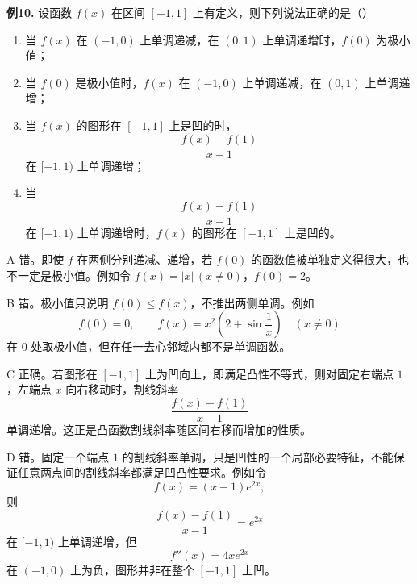 \begin{problemblock}
\textbf{例10.} 设函数 \(f(x)\) 在区间 \([-1,1]\) 上有定义，则下列说法正确的是（\quad）
\begin{enumerate}[label=\Alph*., leftmargin=2.2em]
\item 当 \(f(x)\) 在 \((-1,0)\) 上单调递减，在 \((0,1)\) 上单调递增时，\(f(0)\) 为极小值；
\item 当 \(f(0)\) 是极小值时，\(f(x)\) 在 \((-1,0)\) 上单调递减，在 \((0,1)\) 上单调递增；
\item 当 \(f(x)\) 的图形在 \([-1,1]\) 上是凹的时，
\[
\frac{f(x)-f(1)}{x-1}
\]
在 \([-1,1)\) 上单调递增；
\item 当
\[
\frac{f(x)-f(1)}{x-1}
\]
在 \([-1,1)\) 上单调递增时，\(f(x)\) 的图形在 \([-1,1]\) 上是凹的。
\end{enumerate}
\end{problemblock}
\begin{solutionblock}
A 错。即使 \(f\) 在两侧分别递减、递增，若 \(f(0)\) 的函数值被单独定义得很大，也不一定是极小值。例如令 \(f(x)=|x|\,(x\ne0)\)，\(f(0)=2\)。

B 错。极小值只说明 \(f(0)\le f(x)\)，不推出两侧单调。例如
\[
f(0)=0,\qquad f(x)=x^2\left(2+\sin\frac1x\right)\quad(x\ne0)
\]
在 \(0\) 处取极小值，但在任一去心邻域内都不是单调函数。

C 正确。若图形在 \([-1,1]\) 上为凹向上，即满足凸性不等式，则对固定右端点 \(1\)，左端点 \(x\) 向右移动时，割线斜率
\[
\frac{f(x)-f(1)}{x-1}
\]
单调递增。这正是凸函数割线斜率随区间右移而增加的性质。

D 错。固定一个端点 \(1\) 的割线斜率单调，只是凹性的一个局部必要特征，不能保证任意两点间的割线斜率都满足凹凸性要求。例如令
\[
f(x)=(x-1)e^{2x},
\]
则
\[
\frac{f(x)-f(1)}{x-1}=e^{2x}
\]
在 \([-1,1)\) 上单调递增，但
\[
f''(x)=4xe^{2x}
\]
在 \((-1,0)\) 上为负，图形并非在整个 \([-1,1]\) 上凹。
\end{solutionblock}

